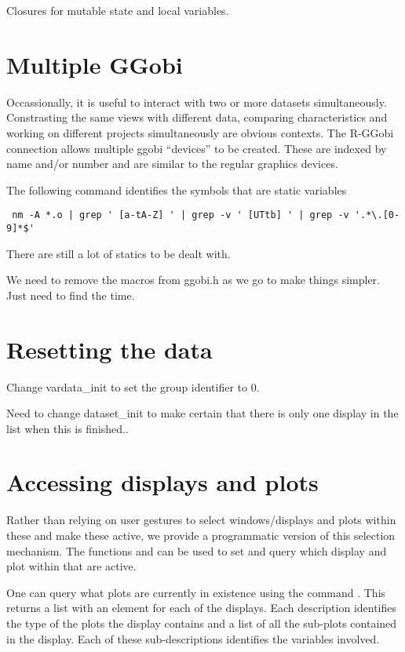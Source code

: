 Closures for mutable state and local variables.



\section{Multiple GGobi}
Occassionally, it is useful to interact with two or more datasets
simultaneously. Constrasting the same views with different data,
comparing characteristics and working on different projects
simultaneously are obvious contexts. The R-GGobi connection allows
multiple ggobi ``devices'' to be created.  These are indexed by name
and/or number and are similar to the regular graphics devices.


The following command identifies
the symbols that are static variables
\begin{verbatim}
 nm -A *.o | grep ' [a-tA-Z] ' | grep -v ' [UTtb] ' | grep -v '.*\.[0-9]*$'
\end{verbatim}

There are still a lot of statics to be dealt with.

We need to remove the macros from ggobi.h as we go to
make things simpler. Just need to find the time.



\section{Resetting the data}

Change vardata_init to set the group identifier to 0.


Need to change dataset_init to make certain that there is only
one display in the list when this is finished..



\section{Accessing displays and plots}
Rather than relying on user gestures to select windows/displays and
plots within these and make these active, we provide a programmatic
version of this selection mechanism.  The functions
 and  can be used to
set and query which display and plot within that are active.


One can query what plots are currently in existence using the command
.  This returns a list with an element
for each of the displays. Each description identifies the type of the
plots the display contains and a list of all the sub-plots contained
in the display. Each of these sub-descriptions identifies the
variables involved.



